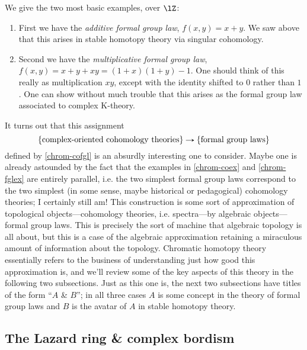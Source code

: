\begin{examples}
  \label{chrom-fglex}
  We give the two most basic examples, over $\lZ$:
  \begin{enumerate}
  \item First we have the \emph{additive formal group law},
    $f(x,y) = x+y$. We saw above that this arises in stable homotopy
    theory via singular cohomology.
  \item Second we have the \emph{multiplicative formal group law},
    $f(x,y) = x+y+xy = (1+x)(1+y)-1$. One should think of this really
    as multiplication $xy$, except with the identity shifted to $0$
    rather than $1$. One can show without much trouble that this
    arises as the formal group law associated to complex K-theory.
  \end{enumerate}
\end{examples}

It turns out that this assignment
\[
\l\{ \text{complex-oriented cohomology theories} \r\} \to
\l\{ \text{formal group laws} \r\}
\]
defined by \cref{chrom-cofgl} is an absurdly interesting one to
consider. Maybe one is already astounded by the fact that the examples
in \cref{chrom-coex} and \cref{chrom-fglex} are entirely parallel,
i.e. the two simplest formal group laws correspond to the two simplest
(in some sense, maybe historical or pedagogical) cohomology theories;
I certainly still am! This construction is some sort of approximation
of topological objects---cohomology theories, i.e. spectra---by
algebraic objects---formal group laws. This is precisely the sort of
machine that algebraic topology is all about, but this is a case of
the algebraic approximation retaining a miraculous amount of
information about the topology. Chromatic homotopy theory essentially
refers to the business of understanding just how good this
approximation is, and we'll review some of the key aspects of this
theory in the following two subsections. Just as this one is, the next
two subsections have titles of the form ``$A$ \& $B$''; in all three
cases $A$ is some concept in the theory of formal group laws and $B$
is the avatar of $A$ in stable homotopy theory.

\subsection{The Lazard ring \& complex bordism}
\label{chrom-lazmu}

